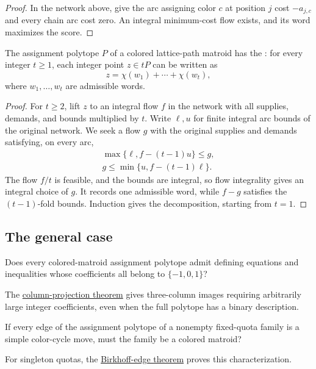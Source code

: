 \begin{proof}
In the network above, give the arc assigning color $c$ at position $j$
cost $-a_{j,c}$ and every chain arc cost zero. An integral minimum-cost
flow exists, and its word maximizes the score.
\end{proof}

\begin{proposition}
The assignment polytope $P$ of a colored lattice-path matroid has the
: for every integer $t\geq1$,
each integer point $z\in tP$ can be written as
\[
 z=\chi(w_1)+\dotsb+\chi(w_t),
\]
where $w_1,\dotsc,w_t$ are admissible words.
\end{proposition}

\begin{proof}
For $t\geq2$, lift $z$ to an integral flow $f$ in the network with all
supplies, demands, and bounds multiplied by $t$. Write $\ell,u$ for
finite integral arc bounds of the original network. We seek a flow $g$
with the original supplies and demands satisfying, on every arc,
\[
 \begin{gathered}
 \max\{\ell,f-(t-1)u\}\leq g,\\
 g\leq\min\{u,f-(t-1)\ell\}.
 \end{gathered}
\]
The flow $f/t$ is feasible, and the bounds are integral, so flow
integrality gives an integral choice of $g$. It records one admissible
word, while $f-g$ satisfies the $(t-1)$-fold bounds. Induction gives
the decomposition, starting from $t=1$.
\end{proof}

\subsection[generalPolytopeDescription]{The general case}

\begin{question}
Does every colored-matroid assignment polytope admit defining equations and
inequalities whose coefficients all belong to $\{-1,0,1\}$?
\end{question}

The \href{projections.htm}{column-projection theorem} gives three-column
images requiring arbitrarily large integer coefficients, even when the
full polytope has a binary description.

\begin{question}
If every edge of the assignment polytope of a nonempty fixed-quota family
is a simple color-cycle move, must the family be a colored matroid?
\end{question}

For singleton quotas, the
\href{permutations.htm#birkhoffEdges}{Birkhoff-edge theorem} proves this
characterization.
